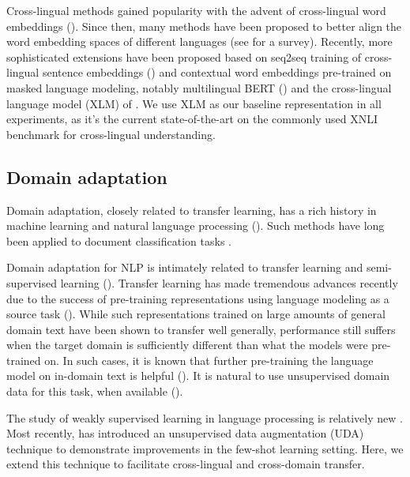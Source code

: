 \documentclass{article} \usepackage{iclr2020_conference,times}
\begin{document}
Cross-lingual methods gained popularity with the advent of cross-lingual word embeddings (\cite{mikolov2013exploiting}).  Since then, many methods have been proposed to better align the word embedding spaces of different languages (see \cite{ruder2017survey} for a survey).  Recently, more sophisticated extensions have been proposed based on seq2seq training of cross-lingual sentence embeddings (\cite{schwenk2017learning, artetxe2018massively}) and contextual word embeddings pre-trained on masked language modeling, notably multilingual BERT (\cite{devlin2018bert}) and the cross-lingual language model (XLM) of \cite{lample2019cross}.  We use XLM as our baseline representation in all experiments, as it's the current state-of-the-art on the commonly used XNLI benchmark for cross-lingual understanding.


\subsection{Domain adaptation}
Domain adaptation, closely related to transfer learning, has a rich history in machine learning and natural language processing (\cite{pan2009survey}). Such methods have long been applied to document classification tasks \citep{blitzer2007biographies, glorot2011domain, al2017approaches, xu2017cross}.

Domain adaptation for NLP is intimately related to transfer learning and semi-supervised learning (\cite{chapelle2009semi}). Transfer learning has made tremendous advances recently due to the success of pre-training representations using language modeling as a source task (\cite{radford2018improving, peters2018deep, devlin2018bert}).  While such representations trained on large amounts of general domain text have been shown to transfer well generally, performance still suffers when the target domain is sufficiently different than what the models were pre-trained on.  In such cases, it is known that further pre-training the language model on in-domain text is helpful (\cite{howard2018universal, chronopoulou2019embarrassingly}).  It is natural to use unsupervised domain data for this task, when available (\cite{lee2019biobert, han2019unsupervised}).  


The study of weakly supervised learning in language processing is relatively new \citep{johnson2016supervised, yu2018diverse}.  Most recently, \cite{xie2019unsupervised} has introduced an unsupervised data augmentation (UDA) technique to demonstrate improvements in the few-shot learning setting.  Here, we extend this technique to facilitate cross-lingual and cross-domain transfer.
 
\end{document}
